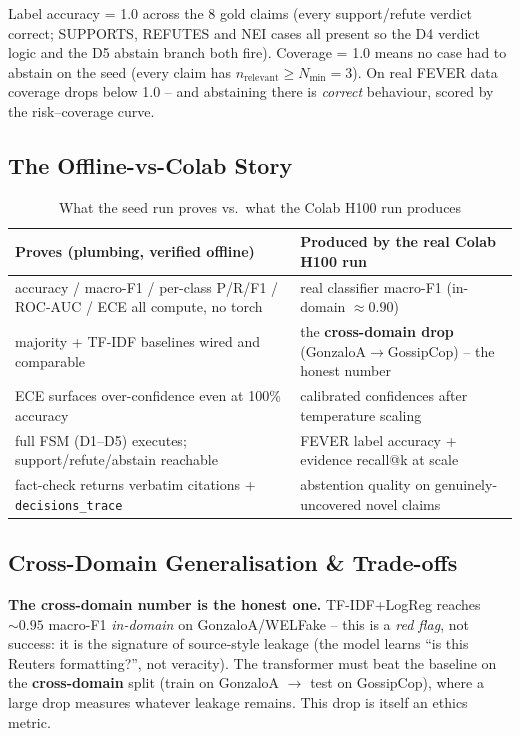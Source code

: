 \documentclass[12pt,a4paper]{article}
\begin{document}
\noindent Label accuracy = 1.0 across the 8 gold claims (every support/refute verdict correct; SUPPORTS, REFUTES and NEI cases all present so the D4 verdict logic and the D5 abstain branch both fire). Coverage = 1.0 means no case had to abstain on the seed (every claim has $n_{\text{relevant}} \geq N_{\min}{=}3$). On real FEVER data coverage drops below 1.0 -- and abstaining there is \emph{correct} behaviour, scored by the risk--coverage curve.

\subsection{The Offline-vs-Colab Story}

\begin{table}[H]
\centering
\caption{What the seed run proves vs.\ what the Colab H100 run produces}
\small
\begin{tabularx}{\linewidth}{@{} L L @{}}
\toprule
\textbf{Proves (plumbing, verified offline)} & \textbf{Produced by the real Colab H100 run} \\
\midrule
accuracy / macro-F1 / per-class P/R/F1 / ROC-AUC / ECE all compute, no torch & real classifier macro-F1 (in-domain $\approx 0.90$) \\
majority + TF-IDF baselines wired and comparable & the \textbf{cross-domain drop} (GonzaloA$\rightarrow$GossipCop) -- the honest number \\
ECE surfaces over-confidence even at 100\% accuracy & calibrated confidences after temperature scaling \\
full FSM (D1--D5) executes; support/refute/abstain reachable & FEVER label accuracy + evidence recall@k at scale \\
fact-check returns verbatim citations + \texttt{decisions\_trace} & abstention quality on genuinely-uncovered novel claims \\
\bottomrule
\end{tabularx}
\end{table}

\subsection{Cross-Domain Generalisation \& Trade-offs}

\textbf{The cross-domain number is the honest one.} TF-IDF+LogReg reaches $\sim 0.95$ macro-F1 \emph{in-domain} on GonzaloA/WELFake -- this is a \emph{red flag}, not success: it is the signature of source-style leakage (the model learns ``is this Reuters formatting?'', not veracity). The transformer must beat the baseline on the \textbf{cross-domain} split (train on GonzaloA $\rightarrow$ test on GossipCop), where a large drop measures whatever leakage remains. This drop is itself an ethics metric.
\end{document}
